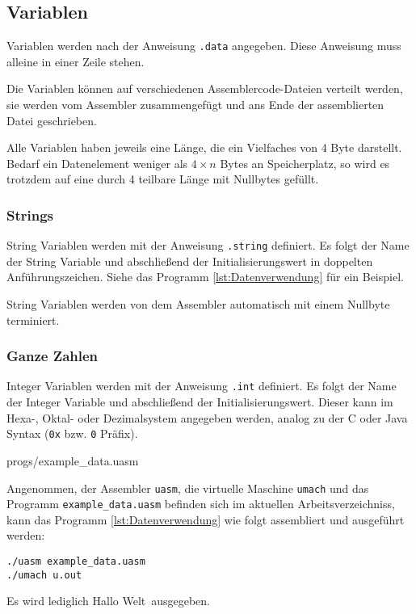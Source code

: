 \subsection{Variablen}

Variablen werden nach der Anweisung \texttt{.data} angegeben. Diese Anweisung
muss alleine in einer Zeile stehen.

Die Variablen können auf verschiedenen Assemblercode-Dateien verteilt werden,
sie werden vom Assembler zusammengefügt und ans Ende der assemblierten Datei
geschrieben.

Alle Variablen haben jeweils eine Länge, die ein Vielfaches von 4 Byte darstellt.
Bedarf ein Datenelement weniger als $4 \times n$ Bytes an Speicherplatz, so wird
es trotzdem auf eine durch 4 teilbare Länge mit Nullbytes gefüllt.

\subsubsection{Strings}

String Variablen werden mit der Anweisung \texttt{.string} definiert. Es folgt
der Name der String Variable und abschließend der Initialisierungswert in 
doppelten Anführungszeichen. Siehe das Programm \ref{lst:Datenverwendung} für ein
Beispiel.

String Variablen werden von dem Assembler automatisch mit einem Nullbyte
terminiert.

\subsubsection{Ganze Zahlen}

Integer Variablen werden mit der Anweisung \texttt{.int} definiert. Es folgt
der Name der Integer Variable und abschließend der Initialisierungswert. Dieser
kann im Hexa-, Oktal- oder Dezimalsystem angegeben werden, analog zu der
C oder Java Syntax (\texttt{0x} bzw. \texttt{0} Präfix).


{progs/example_data.uasm}

Angenommen, der Assembler \texttt{uasm}, die virtuelle Maschine \texttt{umach}
und das Programm \texttt{example\_data.uasm} befinden sich im aktuellen
Arbeitsverzeichniss, kann das Programm \ref{lst:Datenverwendung}  wie folgt
assembliert und ausgeführt werden:
\begin{lstlisting}
./uasm example_data.uasm
./umach u.out
\end{lstlisting}
Es wird lediglich \glqq Hallo Welt\grqq\ ausgegeben.


